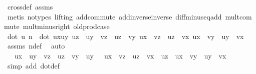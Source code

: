 \begin{isabellebody}
\ cross{\isacharunderscore}{\kern0pt}def\ assms\ \isanewline
\ \ \isamarkupfalse%
\ {\isacharparenleft}{\kern0pt}metis\ {\isacharparenleft}{\kern0pt}no{\isacharunderscore}{\kern0pt}types{\isacharcomma}{\kern0pt}\ lifting{\isacharparenright}{\kern0pt}\ add{\isachardot}{\kern0pt}commute\ add{\isachardot}{\kern0pt}inverse{\isacharunderscore}{\kern0pt}inverse\ diff{\isacharunderscore}{\kern0pt}minus{\isacharunderscore}{\kern0pt}eq{\isacharunderscore}{\kern0pt}add\ mult{\isachardot}{\kern0pt}commute\ mult{\isacharunderscore}{\kern0pt}minus{\isacharunderscore}{\kern0pt}right\ old{\isachardot}{\kern0pt}prod{\isachardot}{\kern0pt}case{\isacharparenright}{\kern0pt}\isanewline
\isanewline
\ \ \isamarkupfalse%
\ {\isachardoublequoteopen}dot\ u\ n\ {\isacharequal}{\kern0pt}\ dot\ {\isacharparenleft}{\kern0pt}ux{\isacharcomma}{\kern0pt}uy{\isacharcomma}{\kern0pt}\ uz{\isacharparenright}{\kern0pt}\ \ {\isacharparenleft}{\kern0pt}uy\ {\isacharasterisk}{\kern0pt}\ vz\ {\isacharminus}{\kern0pt}\ uz\ {\isacharasterisk}{\kern0pt}\ vy{\isacharcomma}{\kern0pt}\ {\isacharminus}{\kern0pt}ux\ {\isacharasterisk}{\kern0pt}\ vz\ {\isacharplus}{\kern0pt}\ uz\ {\isacharasterisk}{\kern0pt}\ vx{\isacharcomma}{\kern0pt}\ ux\ {\isacharasterisk}{\kern0pt}\ vy\ {\isacharminus}{\kern0pt}\ uy\ {\isacharasterisk}{\kern0pt}\ vx{\isacharparenright}{\kern0pt}{\isachardoublequoteclose}\ \isamarkupfalse%
\ assms\ ndef\ \isamarkupfalse%
\ auto\isanewline
\ \ \isamarkupfalse%
\ \isamarkupfalse%
\ {\isachardoublequoteopen}{\isachardot}{\kern0pt}{\isachardot}{\kern0pt}{\isachardot}{\kern0pt}\ {\isacharequal}{\kern0pt}\ ux\ {\isacharasterisk}{\kern0pt}\ {\isacharparenleft}{\kern0pt}uy\ {\isacharasterisk}{\kern0pt}\ vz\ {\isacharminus}{\kern0pt}\ uz\ {\isacharasterisk}{\kern0pt}\ vy{\isacharparenright}{\kern0pt}\ {\isacharplus}{\kern0pt}\ uy\ {\isacharasterisk}{\kern0pt}\ {\isacharparenleft}{\kern0pt}\ {\isacharminus}{\kern0pt}ux\ {\isacharasterisk}{\kern0pt}\ vz\ {\isacharplus}{\kern0pt}\ uz\ {\isacharasterisk}{\kern0pt}\ vx{\isacharparenright}{\kern0pt}\ {\isacharplus}{\kern0pt}\ uz\ {\isacharasterisk}{\kern0pt}\ {\isacharparenleft}{\kern0pt}ux\ {\isacharasterisk}{\kern0pt}\ vy\ {\isacharminus}{\kern0pt}\ uy\ {\isacharasterisk}{\kern0pt}\ vx{\isacharparenright}{\kern0pt}{\isachardoublequoteclose}\ \isanewline
\ \ \ \ \isamarkupfalse%
\ {\isacharparenleft}{\kern0pt}simp\ add{\isacharcolon}{\kern0pt}\ dot{\isacharunderscore}{\kern0pt}def{\isacharparenright}{\kern0pt}\isanewline

\end{isabellebody}

